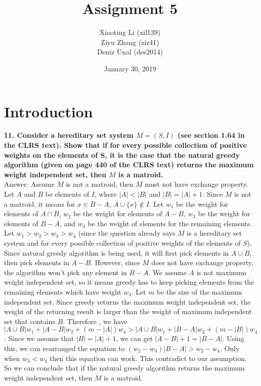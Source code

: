 \documentclass{article}
\title{Assignment 5}
\author{Xiaoting Li (xil139) \\
Ziyu Zhang (ziz41) \\
Deniz Unal (des2014)}
\date{January 30, 2019}
\begin{document}
\maketitle

\section{Introduction}
\noindent
\textbf{11. Consider a hereditary set system $M = (S, I)$ (see section 1.64 in the CLRS text). Show that if for every possible collection of positive weights on the elements of S, it is the case that the natural greedy algorithm (given on page 440 of the CLRS text) returns the maximum weight independent set, then $M$ is a matroid.} \\ \newline
\noindent
Answer:
Assume $M$ is not a matroid, then $M$ must not have exchange property. Let $A$ and $B$ be elements of $I$, where $|A| < |B|$ and $|B| = |A| + 1$. Since $M$ is not a matroid, it means for $x \in B - A$, $A \cup \{x\} \notin I$. Let $w_1$ be the weight for elements of $A \cap B$, $w_2$ be the weight for elements of $A - B$, $w_3$ be the weight for elements of $B - A$, and $w_4$ be the weight of elements for the remaining elements. Let $w_1 > w_2 > w_3 > w_4$ (since the question already says $M$ is a hereditary set system and for every possible collection of positive weights of the elements of $S$). \\ \newline
\noindent
Since natural greedy algorithm is being used, it will first pick elements in $A \cup B$, then pick elements in $A - B$. However, since $M$ does not have exchange property, the algorithm won't pick any element in $B - A$. We assume $A$ is not maximum weight independent set, so it means greedy has to keep picking elements from the remaining elements which have weight $w_4$. Let $m$ be the size of the maximum independent set. Since greedy returns the maximum weight independent set, the weight of the returning result is larger than the weight of maximum independent set that contains $B$. Therefore , we have $|A \cup B|w_1 + |A - B|w_2 + (m - |A|)w_4 > |A \cup B|w_1 + |B - A|w_2 + (m - |B|)w_4$. Since we assume that $|B| = |A| + 1$, we can get $|A - B| + 1 = |B - A|$. Using this, we can rearranged the equation to $(w_2 - w_3)|B - A| > w_2 - w_4$. Only when $w_3 < w_4$ then this equation can work. This contradict to our assumption. So we can conclude that if the natural greedy algorithm returns the maximum weight independent set, then $M$ is a matroid.
\end{document}

